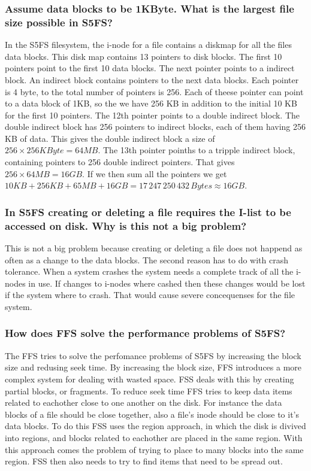 \documentclass{article}
\begin{document}
\subsubsection*{Assume data blocks to be 1KByte. What is the largest file size possible in S5FS?}
In the S5FS filesystem, the i-node for a file contains a diskmap for all the files data blocks. This disk map
contains 13 pointers to disk blocks. The first 10 pointers point to the first 10 data blocks.
The next pointer points to a indirect block. An indirect block contains pointers to the next data blocks. 
Each pointer is 4 byte, to the total number of pointers is 256. Each of theese pointer can point to a data 
block of 1KB, so the we have 256 KB in addition to the initial 10 KB for the first 10 pointers. 
The 12th pointer points to a double indirect block. The double indirect block has 256 pointers to indirect blocks, each of them having 256 KB of data.
This gives the double indirect block a size of $256 \times 256 KByte = 64 MB$.
The 13th pointer poinths to a tripple indirect block, containing pointers to 256 double indirect pointers. 
That gives $256 \times 64 MB = 16 GB$. If we then sum all the
pointers we get $10 KB + 256 KB + 65 MB + 16 GB = 17\,247\,250\,432\,Bytes \approx 16 GB $.

\subsubsection*{In S5FS creating or deleting a file requires the I-list to be accessed on disk. Why is this not a big
problem?}
This is not a big problem because creating or deleting a file does not happend as often as a change to the data blocks. The second reason has to do with crash tolerance. When a system crashes the system needs a complete track of all the i-nodes in use. If changes to i-nodes where cashed then these changes would be lost if the system where to crash. That would cause severe concequenses for the file system.

\subsubsection*{How does FFS solve the performance problems of S5FS?}
The FFS tries to solve the perfomance problems of S5FS by increasing the block size and redusing seek time. By increasing the block size, FFS introduces a more complex system for dealing with wasted space. FSS deals with this by creating partial blocks, or fragments. To reduce seek time FFS tries to keep data items related to eachother close to one another on the disk. For instance the data blocks of a file should be close together, also a file's inode should be close to it's data blocks. To do this FSS uses the region approach, in which the disk is divived into regions, and blocks related to eachother are placed in the same region. With this approach comes the problem of trying to place to many blocks into the same region. FSS then also needs to try to find items that need to be spread out.
\end{document}
